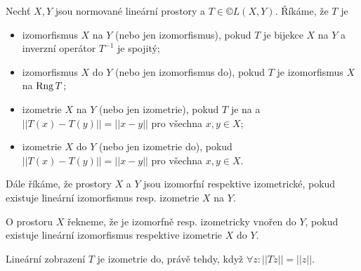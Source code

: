 \documentclass[12pt]{article}					%
\begin{document}
\begin{definice}
	Nechť $X, Y$ jsou normované lineární prostory a $T \in ©L(X, Y)$. Říkáme, že $T$ je
	
	\begin{itemize}
		\item izomorfismus $X$ na $Y$ (nebo jen izomorfismus), pokud $T$ je bijekce $X$ na $Y$ a inverzní operátor $T^{-1}$ je spojitý;
		\item izomorfismus $X$ do $Y$ (nebo jen izomorfismus do), pokud $T$ je izomorfismus $X$ na $\operatorname{Rng} T$;
		\item izometrie $X$ na $Y$ (nebo jen izometrie), pokud $T$ je na a $||T(x) - T(y)|| = ||x - y||$ pro všechna $x, y \in X$;
		\item izometrie $X$ do $Y$ (nebo jen izometrie do), pokud $||T(x) - T(y)|| = ||x - y||$ pro všechna $x, y \in X$.
	\end{itemize}

	Dále říkáme, že prostory $X$ a $Y$ jsou izomorfní respektive izometrické, pokud existuje lineární izomorfismus resp. izometrie $X$ na $Y$.

	O prostoru $X$ řekneme, že je izomorfně resp. izometricky vnořen do $Y$, pokud existuje lineární izomorfismus respektive izometrie $X$ do $Y$.
\end{definice}

\begin{poznamka}
	Lineární zobrazení $T$ je izometrie do, právě tehdy, když $\forall z: ||Tz|| = ||z||$.
\end{poznamka}
\end{document}
